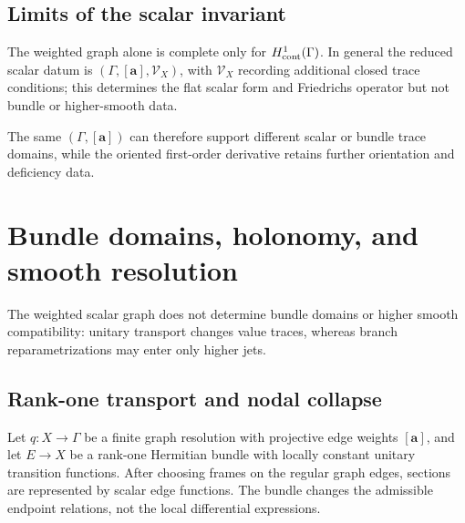 \documentclass[11pt]{article}
\theoremstyle{plain}
\theoremstyle{definition}
\begin{document}
\subsection{Limits of the scalar invariant}
\label{subsec:limits-propagation-graph}

The weighted graph alone is complete only for \(H^1_{\rm cont}(\Gamma)\). In general the reduced scalar datum is \((\Gamma,[\mathbf a],\mathcal V_X)\), with \(\mathcal V_X\) recording additional closed trace conditions; this determines the flat scalar form and Friedrichs operator but not bundle or higher-smooth data.

The same \((\Gamma,[\mathbf a])\) can therefore support different scalar or bundle trace domains, while the oriented first-order derivative retains further orientation and deficiency data.



\section{Bundle domains, holonomy, and smooth resolution}
\label{sec:bundle-smooth-resolution}
\label{sec:bundle-versus-Hamiltonian}
\label{sec:smooth-structure-limits}

The weighted scalar graph does not determine bundle domains or higher smooth compatibility: unitary transport changes value traces, whereas branch reparametrizations may enter only higher jets.

\subsection{Rank-one transport and nodal collapse}
\label{subsec:bundle-fixed-graph}
\label{subsec:bundle-local-equaliser}
\label{subsec:bundle-jets-versus-H1}

Let \(q:X\longrightarrow\Gamma\) be a finite graph resolution with projective edge weights
\([\mathbf a]\), and let \(E\longrightarrow X\) be a rank-one Hermitian bundle with locally constant unitary transition
functions. After choosing frames on the regular graph edges, sections are
represented by scalar edge functions. The bundle changes the admissible
endpoint relations, not the local differential expressions.
\end{document}
